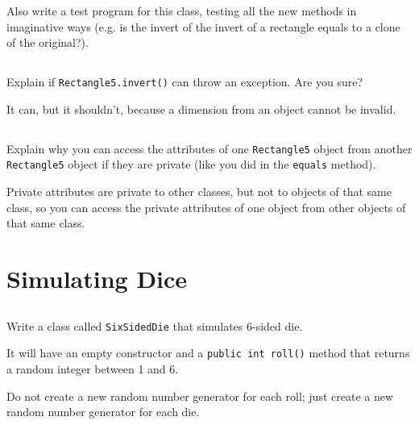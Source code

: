 \documentclass[a4paper, 11pt]{article}
\begin{document}
Also write a test program for this class, testing all the new methods in
imaginative ways (e.g. is the invert of the invert of a rectangle equals to a
clone of the original?).


\subsection{}

Explain if \verb+Rectangle5.invert()+ can throw an exception. Are you sure?

\begin{solution}
It can, but it shouldn't, because a dimension from an object cannot be invalid.
\end{solution}


\subsection{}

Explain why you can access the attributes of one \verb+Rectangle5+ object from
another \verb+Rectangle5+ object if they are private (like you did in the
\verb+equals+ method).

\begin{solution}
Private attributes are private to other classes, but not to objects of
that same class, so you can access the private attributes of one object
from other objects of that same class.
\end{solution}







\section{Simulating Dice}

\subsection{}

Write a class called \texttt{SixSidedDie} that simulates 6-sided die.

It will have an empty constructor and a \verb+public int roll()+ method that
returns a random integer between 1 and 6.

Do not create a new random number generator for each roll; just create a new
random number generator for each die.
\end{document}
